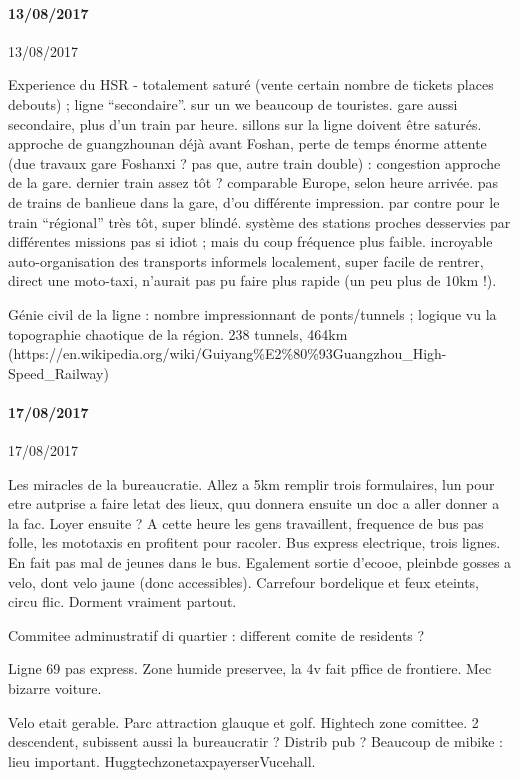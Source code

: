 \paragraph{13/08/2017}{13/08/2017}

Experience du HSR - totalement saturé (vente certain nombre de tickets places debouts) ; ligne ``secondaire''. sur un we beaucoup de touristes. gare aussi secondaire, plus d'un train par heure. sillons sur la ligne doivent être saturés. approche de guangzhounan déjà avant Foshan, perte de temps énorme attente (due travaux gare Foshanxi ? pas que, autre train double) : congestion approche de la gare. dernier train assez tôt ? comparable Europe, selon heure arrivée. pas de trains de banlieue dans la gare, d'ou différente impression. par contre pour le train ``régional'' très tôt, super blindé. système des stations proches desservies par différentes missions pas si idiot ; mais du coup fréquence plus faible. incroyable auto-organisation des transports informels localement, super facile de rentrer, direct une moto-taxi, n'aurait pas pu faire plus rapide (un peu plus de 10km !).

Génie civil de la ligne : nombre impressionnant de ponts/tunnels ; logique vu la topographie chaotique de la région. 238 tunnels, 464km (https://en.wikipedia.org/wiki/Guiyang{\%}E2{\%}80{\%}93Guangzhou{\_}High-Speed{\_}Railway)




\paragraph{17/08/2017}{17/08/2017}


Les miracles de la bureaucratie. Allez a 5km remplir trois formulaires, lun pour etre autprise a faire letat des lieux, quu donnera ensuite un doc a aller donner a la fac. Loyer ensuite ?
A cette heure les gens travaillent, frequence de bus pas folle, les mototaxis en profitent pour racoler.
Bus express electrique, trois lignes. En fait pas mal de jeunes dans le bus. Egalement sortie d'ecooe, pleinbde gosses a velo, dont velo jaune (donc accessibles).
Carrefour bordelique et feux eteints, circu flic.
Dorment vraiment partout.

Commitee adminustratif di quartier : different comite de residents ?

Ligne 69 pas express.
Zone humide preservee, la 4v fait pffice de frontiere.
Mec bizarre voiture.



Velo etait gerable.
Parc attraction glauque et golf.
Hightech zone comittee.
2 descendent, subissent aussi la bureaucratir ?
Distrib pub ?
Beaucoup de mibike : lieu important.
HuggtechzonetaxpayerserVucehall.


